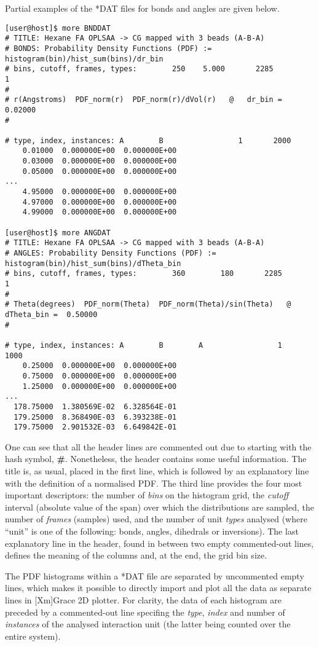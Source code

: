 Partial examples of the *DAT files for bonds and angles are given below.

\begin{verbatim}
[user@host]$ more BNDDAT
# TITLE: Hexane FA OPLSAA -> CG mapped with 3 beads (A-B-A)
# BONDS: Probability Density Functions (PDF) := histogram(bin)/hist_sum(bins)/dr_bin
# bins, cutoff, frames, types:        250    5.000       2285          1
#
# r(Angstroms)  PDF_norm(r)  PDF_norm(r)/dVol(r)   @   dr_bin =  0.02000
#

# type, index, instances: A        B                 1       2000
    0.01000  0.000000E+00  0.000000E+00
    0.03000  0.000000E+00  0.000000E+00
    0.05000  0.000000E+00  0.000000E+00
...
    4.95000  0.000000E+00  0.000000E+00
    4.97000  0.000000E+00  0.000000E+00
    4.99000  0.000000E+00  0.000000E+00

[user@host]$ more ANGDAT
# TITLE: Hexane FA OPLSAA -> CG mapped with 3 beads (A-B-A)
# ANGLES: Probability Density Functions (PDF) := histogram(bin)/hist_sum(bins)/dTheta_bin
# bins, cutoff, frames, types:        360        180       2285          1
#
# Theta(degrees)  PDF_norm(Theta)  PDF_norm(Theta)/sin(Theta)   @   dTheta_bin =  0.50000
#

# type, index, instances: A        B        A                 1       1000
    0.25000  0.000000E+00  0.000000E+00
    0.75000  0.000000E+00  0.000000E+00
    1.25000  0.000000E+00  0.000000E+00
...
  178.75000  1.380569E-02  6.328564E-01
  179.25000  8.368490E-03  6.393238E-01
  179.75000  2.901532E-03  6.649842E-01
\end{verbatim}

One can see that all the header lines are commented out due 
to starting with the hash symbol, {\bf \#}. Nonetheless, the 
header contains some useful information. The title is, as usual, 
placed in the first line, which is followed by an explanatory 
line with the definition of a normalised PDF. 
The third line provides the four most important descriptors: 
the number of {\em bins} on the histogram grid, the {\em cutoff} 
interval (absolute value of the span) over which the distributions 
are sampled, the number of {\em frames} (samples) used, and 
the number of unit {\em types} analysed (where ``unit'' is one 
of the following: bonds, angles, dihedrals or inversions). 
The last explanatory line in the header, found in between 
two empty commented-out lines, defines the meaning of 
the columns and, at the end, the grid bin size. 

The PDF histograms within a *DAT file are separated by uncommented 
empty lines, which makes it possible to directly import and plot 
all the data as separate lines in [Xm]Grace 2D plotter. For clarity, 
the data of each histogram are preceded by a commented-out line 
specifing the {\em type}, {\em index} and number of {\em instances} 
of the analysed interaction unit (the latter being counted over 
the entire system). 

